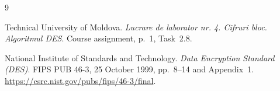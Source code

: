 \begin{thebibliography}{9}
\singlespace\normalsize\raggedright
{}
Technical University of Moldova.
\textit{Lucrare de laborator nr. 4. Cifruri bloc. Algoritmul DES}.
Course assignment, p.~1, Task~2.8.

National Institute of Standards and Technology.
\textit{Data Encryption Standard (DES)}. FIPS PUB 46-3,
25 October 1999, pp.~8--14 and Appendix~1.
\url{https://csrc.nist.gov/pubs/fips/46-3/final}.
\end{thebibliography}

